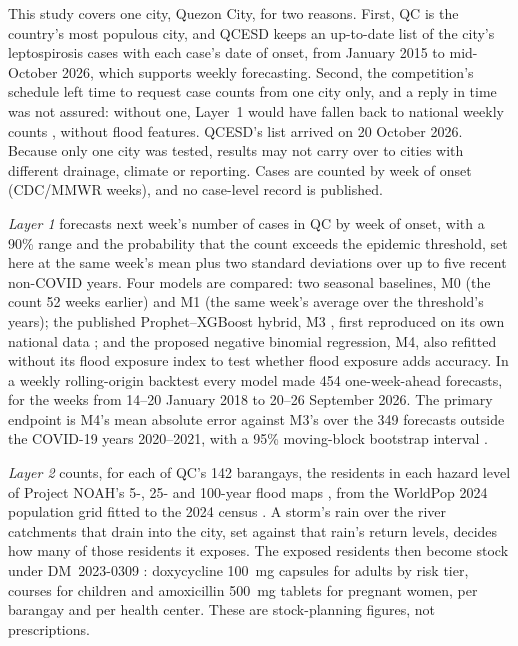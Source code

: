 This study covers one city, Quezon City, for two reasons. First, QC is the country's most
populous city, and QCESD keeps an up-to-date list of the city's leptospirosis cases with each
case's date of onset, from January 2015 to mid-October 2026, which supports weekly forecasting.
Second, the competition's schedule left time to request case counts from one city only,
and a reply in time was not assured: without one, Layer~1 would have fallen back to national
weekly counts \parencite{parreno2023}, without flood features. QCESD's list arrived on 20 October
2026. Because only one city was tested, results may not carry over to cities with different
drainage, climate or reporting. Cases are counted by week of onset (CDC/MMWR weeks), and no
case-level record is published.

\emph{Layer 1} forecasts next week's number of cases in QC by week of onset, with a 90\% range
and the probability that the count exceeds the epidemic threshold, set here at the same week's
mean plus two standard deviations over up to five recent non-COVID years. Four models are
compared: two seasonal baselines, M0 (the count 52 weeks earlier) and M1 (the same week's
average over the threshold's years); the published Prophet--XGBoost hybrid, M3
\parencite{latigay2026}, first reproduced on its own national data \parencite{parreno2023}; and
the proposed negative binomial regression, M4, also refitted without its flood exposure index to
test whether flood exposure adds accuracy. In a weekly
rolling-origin backtest every model made 454 one-week-ahead forecasts, for the weeks from
14--20 January 2018 to 20--26 September 2026. The primary endpoint is M4's mean absolute error
against M3's over the 349 forecasts outside the COVID-19 years 2020--2021, with a 95\%
moving-block bootstrap interval \parencite{kunsch1989}.

\emph{Layer 2} counts, for each of QC's 142 barangays, the residents in each hazard level of
Project NOAH's 5-, 25- and 100-year flood maps \parencite{noah_nd}, from the WorldPop 2024
population grid \parencite{bondarenko2025} fitted to the 2024 census
\parencite{psa_census2024}. A storm's rain over the river catchments that drain into the city,
set against that rain's return levels, decides how many of those residents it exposes. The
exposed residents then become stock under DM~\mbox{2023-0309} \parencite{doh2023}: doxycycline 100~mg
capsules for adults by risk tier, courses for children and amoxicillin 500~mg tablets for
pregnant women, per barangay and per health center. These are stock-planning figures, not
prescriptions.

